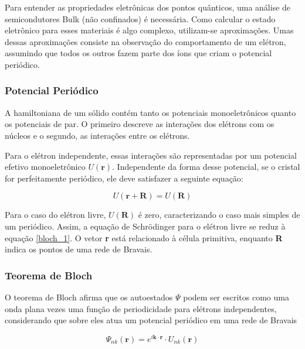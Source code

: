 \par Para entender as propriedades eletrônicas dos pontos quânticos, uma análise de semicondutores Bulk (não confinados) é necessária. Como calcular o estado eletrônico para esses materiais é algo complexo, utilizam-se aproximações. Umas dessas aproximações consiste na observação do comportamento de um elétron, assumindo que todos os outros fazem parte dos íons que criam o potencial periódico.

\subsubsection{Potencial Periódico}

	\par A hamiltoniana\cite{qm_fis5} de um sólido contém tanto os potenciais monoeletrônicos quanto os potenciais de par. O primeiro descreve as interações dos elétrons com os núcleos e o segundo, as interações entre os elétrons. 

	\par Para o elétron independente, essas interações são representadas por um potencial efetivo monoeletrônico $U(\mathbf{r})$. Independente da forma desse potencial, se o cristal for perfeitamente periódico, ele deve satisfazer a seguinte equação:

	\begin{equation}
		\label{bloch_1}
		U(\mathbf{r}+\mathbf{R}) = U(\mathbf{R})
	\end{equation}

	Para o caso do elétron livre, $U(\mathbf{R})$ é zero, caracterizando o caso mais simples de um periódico. Assim, a equação de Schrödinger para o elétron livre se reduz à equação \eqref{bloch_1}. O vetor \textbf{r} está relacionado à célula primitiva, enquanto \textbf{R} indica os pontos de uma rede de Bravais\cite{qm_fis2}.

\subsubsection{Teorema de Bloch}

	\par O teorema de Bloch\cite{qm_fis5} afirma que os autoestados $\Psi$ podem ser escritos como uma onda plana vezes uma função de periodicidade para elétrons independentes, considerando que sobre eles atua um potencial periódico em uma rede de Bravais

	\begin{equation}
		\label{bloch_2}
		\Psi_{nk}(\mathbf{r})= e^{i\mathbf{k} \cdot \mathbf{r}}\cdot U_{nk}(\mathbf{r})
	\end{equation}

